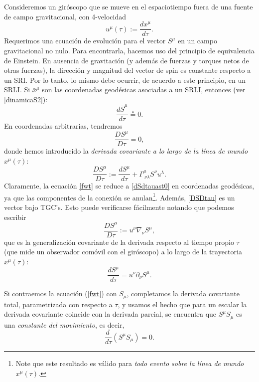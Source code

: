 Consideremos un giróscopo que se mueve en el espaciotiempo fuera de una fuente de campo gravitacional, con 4-velocidad
\begin{equation}
u^\mu (\tau):=\frac{dx^\mu }{d\tau}.
\end{equation}
Requerimos una ecuación de evolución para el vector $S^\mu$ en un campo gravitacional no nulo. Para encontrarla, hacemos uso del principio de equivalencia de Einstein. En ausencia de gravitación (y además de fuerzas y torques netos de otras fuerzas), la dirección y magnitud del vector de spin es constante respecto a un SRI. Por lo tanto, lo mismo debe ocurrir, de acuerdo a este principio, en un SRLI. Si $\bar{x}^\mu$ son las coordenadas geodésicas asociadas a un SRLI, entonces (ver \eqref{dinamicaS2}): 
\begin{equation}\label{dSdtauast0}
\frac{d\bar{S}^\mu }{d\tau}\stackrel{*}{=}0.
\end{equation}
En coordenadas arbitrarias, tendremos
\begin{equation}\label{fwt}
\boxed{\frac{DS^\mu }{D\tau}=0,}
\end{equation}
donde hemos introducido la \textit{derivada covariante a lo largo de la línea de mundo $x^\mu(\tau)$}:
\begin{equation}\label{DSDtau}
\frac{DS^\mu}{D\tau}:=\frac{dS^\mu}{d\tau}+\Gamma^{\mu}_{\ \nu\lambda}S^\nu u^\lambda .
\end{equation}
Claramente, la ecuación \eqref{fwt} se reduce a \eqref{dSdtauast0} en coordenadas geodésicas, ya que las componentes de la conexión se anulan\footnote{Note que este resultado es válido para \textit{todo evento sobre la línea de mundo} $x^\mu(\tau)$.}. Además, \eqref{DSDtau} es un vector bajo TGC's. Esto puede verificarse fácilmente notando que podemos escribir
\begin{equation}
\frac{DS^\mu}{D\tau}:=u^\nu\nabla_\nu S^\mu,
\end{equation}
que es la generalización covariante de la derivada respecto al tiempo propio $\tau$ (que mide un observador comóvil con el giróscopo) a lo largo de la trayectoria $x^\mu (\tau)$:
\begin{equation}
\frac{dS^\mu }{d\tau}=u^{\nu}\partial_{\nu} S^{\mu}.
\end{equation}

Si contraemos la ecuación (\ref{fwt}) con $S_{\mu}$, completamos la derivada covariante total, parametrizada con respecto a $\tau$, y usamos el hecho que para un escalar la derivada covariante coincide con la derivada parcial, se encuentra que $S^\mu S_{\mu}$ es una \textit{constante del movimiento}, es decir,
\begin{equation}\boxed{
\frac{d\ }{d\tau}\left(S^\mu S_{\mu}\right)=0.}\label{SSconstante}
\end{equation}

